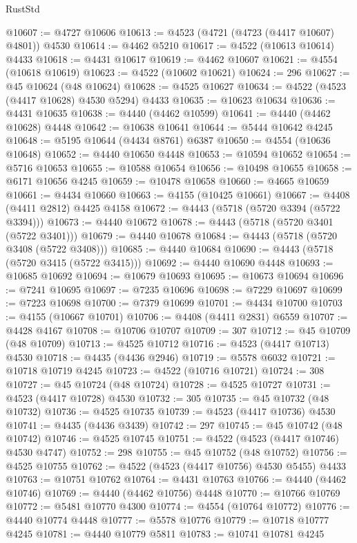 \begin{lexlean}{RustStd}
\begin{coremodule}
{\begin{coremodule}
{{{{{{{{{{{{{{{{{{{{{{{{{{{{{{{{{{{{{{{{{{{{{{{{{{{{{{{{{{{{@10607 := @4727 @10606
@10613 := @4523 (@4721 (@4723 (@4417 @10607) @4801)) @4530
@10614 := @4462 @5210
@10617 := @4522 (@10613 @10614) @4433
@10618 := @4431 @10617
@10619 := @4462 @10607
@10621 := @4554 (@10618 @10619)
@10623 := @4522 (@10602 @10621)
@10624 := 296
@10627 := @45 @10624 (@48 @10624)
@10628 := @4525 @10627
@10634 := @4522 (@4523 (@4417 @10628) @4530 @5294) @4433
@10635 := @10623 @10634
@10636 := @4431 @10635
@10638 := @4440 (@4462 @10599)
@10641 := @4440 (@4462 @10628) @4448
@10642 := @10638 @10641
@10644 := @5444 @10642 @4245
@10648 := @5195 @10644 (@4434 @8761) @6387
@10650 := @4554 (@10636 @10648)
@10652 := @4440 @10650 @4448
@10653 := @10594 @10652
@10654 := @5716 @10653
@10655 := @10588 @10654
@10656 := @10498 @10655
@10658 := @6171 @10656 @4245
@10659 := @10478 @10658
@10660 := @4665 @10659
@10661 := @4434 @10660
@10663 := @4155 (@10425 @10661)
@10667 := @4408 (@4411 @2812) @4425 @4158
@10672 := @4443 (@5718 (@5720 @3394 (@5722 @3394)))
@10673 := @4440 @10672
@10678 := @4443 (@5718 (@5720 @3401 (@5722 @3401)))
@10679 := @4440 @10678
@10684 := @4443 (@5718 (@5720 @3408 (@5722 @3408)))
@10685 := @4440 @10684
@10690 := @4443 (@5718 (@5720 @3415 (@5722 @3415)))
@10692 := @4440 @10690 @4448
@10693 := @10685 @10692
@10694 := @10679 @10693
@10695 := @10673 @10694
@10696 := @7241 @10695
@10697 := @7235 @10696
@10698 := @7229 @10697
@10699 := @7223 @10698
@10700 := @7379 @10699
@10701 := @4434 @10700
@10703 := @4155 (@10667 @10701)
@10706 := @4408 (@4411 @2831) @6559
@10707 := @4428 @4167
@10708 := @10706 @10707
@10709 := 307
@10712 := @45 @10709 (@48 @10709)
@10713 := @4525 @10712
@10716 := @4523 (@4417 @10713) @4530
@10718 := @4435 (@4436 @2946)
@10719 := @5578 @6032
@10721 := @10718 @10719 @4245
@10723 := @4522 (@10716 @10721)
@10724 := 308
@10727 := @45 @10724 (@48 @10724)
@10728 := @4525 @10727
@10731 := @4523 (@4417 @10728) @4530
@10732 := 305
@10735 := @45 @10732 (@48 @10732)
@10736 := @4525 @10735
@10739 := @4523 (@4417 @10736) @4530
@10741 := @4435 (@4436 @3439)
@10742 := 297
@10745 := @45 @10742 (@48 @10742)
@10746 := @4525 @10745
@10751 := @4522 (@4523 (@4417 @10746) @4530 @4747)
@10752 := 298
@10755 := @45 @10752 (@48 @10752)
@10756 := @4525 @10755
@10762 := @4522 (@4523 (@4417 @10756) @4530 @5455) @4433
@10763 := @10751 @10762
@10764 := @4431 @10763
@10766 := @4440 (@4462 @10746)
@10769 := @4440 (@4462 @10756) @4448
@10770 := @10766 @10769
@10772 := @5481 @10770 @4300
@10774 := @4554 (@10764 @10772)
@10776 := @4440 @10774 @4448
@10777 := @5578 @10776
@10779 := @10718 @10777 @4245
@10781 := @4440 @10779 @5811
@10783 := @10741 @10781 @4245
}}}}}}}}}}}}}}}}}}}}}}}}}}}}}}}}}}}}}}}}}}}}}}}}}}}}}}}}}}}}
\end{coremodule}}
\end{coremodule}
\end{lexlean}
